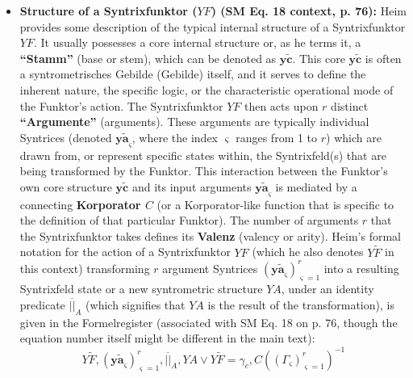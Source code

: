 \documentclass[12pt]{article}
\newcommand{\q}[1]{\enquote{#1}}
\newcommand{\syntrix}{\bm{y\widetilde{a}}}
\newcommand{\syntrometrischesGebilde}{\text{Gebilde}}
\newcommand{\syntrixfunktor}{YF}
\begin{document}
\begin{itemize}
    \item \textbf{Structure of a Syntrixfunktor (\(\syntrixfunktor\)) (SM Eq. 18 context, p. 76):}
    Heim provides some description of the typical internal structure of a Syntrixfunktor \( \syntrixfunktor \). It usually possesses a core internal structure or, as he terms it, a \textbf{\q{Stamm}} (base or stem), which can be denoted as \( \mathbf{y\widetilde{c}} \). This core \( \mathbf{y\widetilde{c}} \) is often a syntrometrisches Gebilde (\(\syntrometrischesGebilde\)) itself, and it serves to define the inherent nature, the specific logic, or the characteristic operational mode of the Funktor's action. The Syntrixfunktor \( \syntrixfunktor \) then acts upon \( r \) distinct \textbf{\q{Argumente}} (arguments). These arguments are typically individual Syntrices (denoted \( \syntrix_\varsigma \), where the index \( \varsigma \) ranges from 1 to \( r \)) which are drawn from, or represent specific states within, the Syntrixfeld(s) that are being transformed by the Funktor. This interaction between the Funktor's own core structure \( \mathbf{y\widetilde{c}} \) and its input arguments \( \syntrix_\varsigma \) is mediated by a connecting \textbf{Korporator \( C \)} (or a Korporator-like function that is specific to the definition of that particular Funktor). The number of arguments \( r \) that the Syntrixfunktor takes defines its \textbf{Valenz} (valency or arity).
    Heim's formal notation for the action of a Syntrixfunktor \( \syntrixfunktor \) (which he also denotes \( Y\tilde{F} \) in this context) transforming \( r \) argument Syntrices \( (\syntrix_\varsigma)^r_{\varsigma=1} \) into a resulting Syntrixfeld state or a new syntrometric structure \( YA \), under an identity predicate \( \overline{||}_A \) (which signifies that \(YA\) is the result of the transformation), is given in the Formelregister (associated with SM Eq. 18 on p. 76, though the equation number itself might be different in the main text):
    \begin{equation}
    Y\tilde{F}, (\syntrix_\varsigma)^r_{\varsigma=1}, \overline{||}_A, YA \vee Y\tilde{F} = \gamma_c, C( (\Gamma_\varsigma)^r_{\varsigma=1} )^{-1}
    \label{eq:original_syntrixfunktor_action}
    \end{equation}

\end{itemize}
\end{document}
